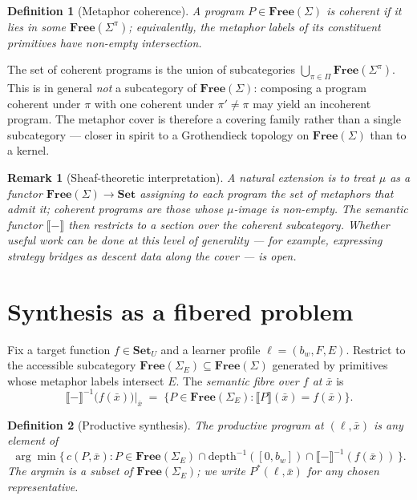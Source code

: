 \documentclass[11pt]{article}
\newtheorem{definition}{Definition}
\newtheorem{remark}{Remark}
\begin{document}
\begin{definition}[Metaphor coherence]
A program $P \in \mathbf{Free}(\Sigma)$ is \emph{coherent} if it lies
in some $\mathbf{Free}(\Sigma^\pi)$; equivalently, the metaphor
labels of its constituent primitives have non-empty intersection.
\end{definition}

The set of coherent programs is the union of subcategories
$\bigcup_{\pi \in \Pi} \mathbf{Free}(\Sigma^\pi)$. This is in general
\emph{not} a subcategory of $\mathbf{Free}(\Sigma)$: composing a
program coherent under $\pi$ with one coherent under $\pi' \ne \pi$
may yield an incoherent program. The metaphor cover is therefore a
covering family rather than a single subcategory — closer in spirit to
a Grothendieck topology on $\mathbf{Free}(\Sigma)$ than to a kernel.

\begin{remark}[Sheaf-theoretic interpretation]
A natural extension is to treat $\mu$ as a functor
$\mathbf{Free}(\Sigma) \to \mathbf{Set}$ assigning to each program the
set of metaphors that admit it; coherent programs are those whose
$\mu$-image is non-empty. The semantic functor
$\llbracket - \rrbracket$ then restricts to a section over the
coherent subcategory. Whether useful work can be done at this level
of generality — for example, expressing strategy bridges as
descent data along the cover — is open.
\end{remark}

\section{Synthesis as a fibered problem}

Fix a target function $f \in \mathbf{Set}_U$ and a learner profile
$\ell = (b_w, F, E)$. Restrict to the accessible subcategory
$\mathbf{Free}(\Sigma_E) \subseteq \mathbf{Free}(\Sigma)$ generated by
primitives whose metaphor labels intersect $E$. The
\emph{semantic fibre over $f$ at $\bar{x}$} is
\[
\llbracket - \rrbracket^{-1}\big(f(\bar{x})\big)\big|_{\bar{x}}
\;=\; \big\{ P \in \mathbf{Free}(\Sigma_E) : \llbracket P
\rrbracket(\bar{x}) = f(\bar{x}) \big\}.
\]

\begin{definition}[Productive synthesis]
The \emph{productive program at $(\ell, \bar{x})$} is any element of
\[
\arg\min \Big\{\, c(P, \bar{x}) : P \in \mathbf{Free}(\Sigma_E)
\cap \mathrm{depth}^{-1}([0, b_w])\cap \llbracket -
\rrbracket^{-1}(f(\bar{x})) \,\Big\}.
\]
The argmin is a subset of $\mathbf{Free}(\Sigma_E)$; we write
$P^*(\ell, \bar{x})$ for any chosen representative.
\end{definition}
\end{document}
